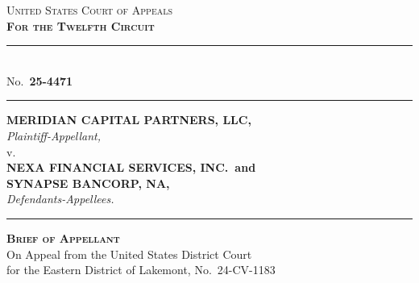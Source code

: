 \documentclass[12pt]{article}
\newcommand{\goldrule}{%
  {\color{GoldAccent}\rule{\linewidth}{0.8pt}}%
}
\begin{document}

\thispagestyle{plain}

\begin{center}


\vspace{18pt}

{\footnotesize\scshape\color{SlateGrey} United States Court of Appeals}\\[2pt]
{\Large\bfseries\color{NavyDeep}\scshape For the Twelfth Circuit}\\[6pt]
{\small\color{GoldAccent}\rule{4cm}{0.6pt}}\\[18pt]

{\normalsize\color{SlateGrey} No.\ \textbf{25-4471}}\\[16pt]

\goldrule\par
\vspace{10pt}

{\LARGE\bfseries\color{NavyDeep} MERIDIAN CAPITAL PARTNERS, LLC,}\\[4pt]
{\normalsize\itshape\color{SlateGrey} Plaintiff-Appellant,}\\[10pt]
{\normalsize\color{SlateGrey} v.}\\[10pt]
{\LARGE\bfseries\color{NavyDeep} NEXA FINANCIAL SERVICES, INC.\ and}\\[2pt]
{\LARGE\bfseries\color{NavyDeep} SYNAPSE BANCORP, NA,}\\[4pt]
{\normalsize\itshape\color{SlateGrey} Defendants-Appellees.}\\[10pt]

\goldrule

\vspace{16pt}

\begin{tcolorbox}[
  enhanced,
  colback=NavyDeep,
  colframe=GoldAccent,
  arc=3pt,
  boxrule=1pt,
  width=0.72\linewidth,
  halign=center,
  left=12pt, right=12pt, top=8pt, bottom=8pt
]
  {\large\bfseries\color{white}\scshape Brief of Appellant}\\[3pt]
  {\small\color{GoldAccent} On Appeal from the United States District Court}\\
  {\small\color{GoldAccent} for the Eastern District of Lakemont, No.\ 24-CV-1183}
\end{tcolorbox}


\end{center}
\end{document}

